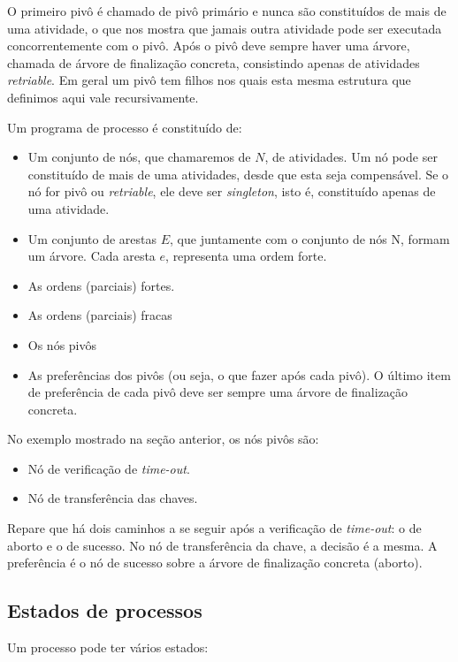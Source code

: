 \documentclass[a4paper,12pt,notitlepage]{article}
\begin{document}
O primeiro pivô é chamado de pivô primário e nunca são constituídos de mais de uma atividade, o que nos mostra que jamais outra atividade pode ser executada concorrentemente com o pivô. Após o pivô deve sempre haver uma árvore, chamada de árvore de finalização concreta, consistindo apenas de atividades \textit{retriable}. Em geral um pivô tem filhos nos quais esta mesma estrutura que definimos aqui vale recursivamente. 

Um programa de processo é constituído de:
\begin{itemize}
  \item Um conjunto de nós, que chamaremos de $N$, de atividades. Um nó pode ser constituído de mais de uma atividades, desde que esta seja compensável. Se o nó for pivô ou \textit{retriable}, ele deve ser \textit{singleton}, isto é, constituído apenas de uma atividade.
  \item Um conjunto de arestas $E$, que juntamente com o conjunto de nós N, formam um árvore. Cada aresta $e$, representa uma ordem forte.
  \item As ordens (parciais) fortes.
  \item As ordens (parciais) fracas
  \item Os nós pivôs
  \item As preferências dos pivôs (ou seja, o que fazer após cada pivô). O último item de preferência de cada pivô deve ser sempre uma árvore de finalização concreta.
\end{itemize}
  
No exemplo mostrado na seção anterior, os nós pivôs são: 
\begin{itemize}  
  \item Nó de verificação de \textit{time-out}. 
  \item Nó de transferência das chaves.
\end{itemize}

Repare que há dois caminhos a se seguir após a verificação de \textit{time-out}: o de aborto e o de sucesso. No nó de transferência da chave, a decisão é a mesma. A preferência é o nó de sucesso sobre a árvore 
de finalização concreta (aborto).

\subsection{Estados de processos}

Um processo pode ter vários estados:
\end{document}
